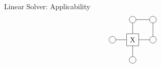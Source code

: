 \begin{frame}{Linear Solver: Applicability}
    \begin{equation}
        \vcenter{\hbox{  \begin{tikzpicture}[baseline=0.5]

                    \def \legLength { 0.8}
                    \def \radius {0.1}

                    \pgfmathsetmacro{\step}{2*\radius+ \legLength} %
                    \pgfmathsetmacro{\legpos}{\radius+\legLength} %

                    \node[draw, circle,radius=\radius] (L0) at (-1,0) {};

                    \draw (-0.3,0.3) -- (0.3,0.3) -- (0.3,-0.3) -- (-0.3,-0.3) -- cycle;

                    \node[draw, circle,radius=\radius] (R0) at (1,0) {};
                    \node[draw, circle,radius=\radius] (R1) at (1,1) {};

                    \node[draw, circle,radius=\radius] (U) at (0,1) {};
                    \node[draw, circle,radius=\radius] (D) at (0,-1) {};

                    \draw (R0) --   (R1);

                    \draw (L0) --   (-0.3,0);

                    \draw (R0) --   (0.3,0);
                    \draw (U) --   (0,0.3);
                    \draw (D) --   (0,-0.3);
                    \draw (R1) --   (U);

                    \node[draw=none] (C0) at (0,0) {X};
                \end{tikzpicture} }}
    \end{equation}
\end{frame}

